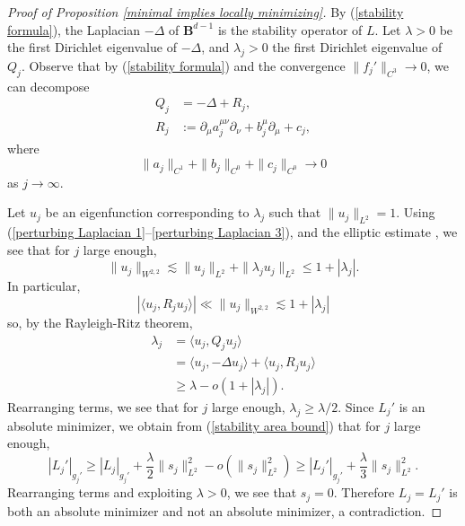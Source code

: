 \documentclass[reqno,11pt]{amsart}
\newcommand{\Ball}{\mathbf{B}}
\theoremstyle{definition}
\numberwithin{equation}{section}
\begin{document}
\begin{proof}[Proof of Proposition \ref{minimal implies locally minimizing}]
By (\ref{stability formula}), the Laplacian $-\Delta$ of $\Ball^{d - 1}$ is the stability operator of $L$.
Let $\lambda > 0$ be the first Dirichlet eigenvalue of $-\Delta$, and $\lambda_j > 0$ the first Dirichlet eigenvalue of $Q_j$.
Observe that by (\ref{stability formula}) and the convergence $\|f_j'\|_{C^3} \to 0$, we can decompose 
\begin{align}
Q_j &= -\Delta + R_j, \label{perturbing Laplacian 1}\\
R_j &:= \partial_\mu a_j^{\mu \nu} \partial_\nu + b_j^\mu \partial_\mu + c_j, \label{perturbing Laplacian 2}
\end{align}
where
\begin{equation}
\|a_j\|_{C^1} + \|b_j\|_{C^0} + \|c_j\|_{C^0} \to 0 \label{perturbing Laplacian 3}
\end{equation}
as $j \to \infty$.

Let $u_j$ be an eigenfunction corresponding to $\lambda_j$ such that $\|u_j\|_{L^2} = 1$.
Using (\ref{perturbing Laplacian 1}--\ref{perturbing Laplacian 3}), and the elliptic estimate \cite[Theorem 8.12]{gilbarg2015elliptic}, we see that for $j$ large enough, 
$$\|u_j\|_{W^{2, 2}} \lesssim \|u_j\|_{L^2} + \|\lambda_j u_j\|_{L^2} \leq 1 + |\lambda_j|.$$
In particular,
$$|\langle u_j, R_j u_j\rangle| \ll \|u_j\|_{W^{2, 2}} \lesssim 1 + |\lambda_j|$$
so, by the Rayleigh-Ritz theorem,
\begin{align*}
\lambda_j 
&= \langle u_j, Q_j u_j\rangle \\
&= \langle u_j, -\Delta u_j\rangle + \langle u_j, R_j u_j\rangle \\
&\geq \lambda - o(1 + |\lambda_j|).
\end{align*}
Rearranging terms, we see that for $j$ large enough, $\lambda_j \geq \lambda/2$.
Since $L_j'$ is an absolute minimizer, we obtain from (\ref{stability area bound}) that for $j$ large enough,
$$|L_j'|_{g_j'} \geq |L_j|_{g_j'} + \frac{\lambda}{2} \|s_j\|_{L^2}^2 - o(\|s_j\|_{L^2}^2) \geq |L_j'|_{g_j'} + \frac{\lambda}{3} \|s_j\|_{L^2}^2.$$
Rearranging terms and exploiting $\lambda > 0$, we see that $s_j = 0$.
Therefore $L_j = L_j'$ is both an absolute minimizer and not an absolute minimizer, a contradiction.
\end{proof}

\printbibliography
\end{document}
